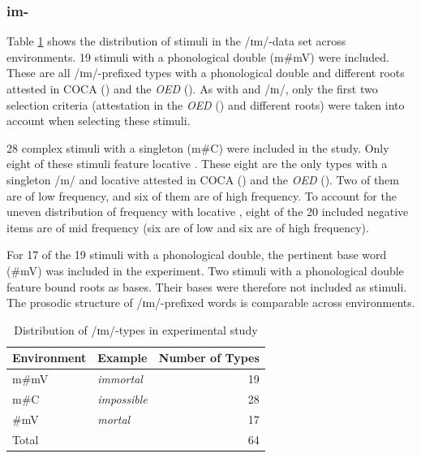 \subsubsection{im-}

Table \ref{tbl:distribution of im types in experiment} shows the distribution of  stimuli in the /ɪm/-data set across environments. 19 stimuli with a phonological double ({m\#mV}) were included. These are all /ɪm/-prefixed types with a phonological double and different roots attested in COCA (\citealt{Davies.20082014}) and the \textit{OED} (\citealt{OED.2013}). As with  and /ɪn/, only the first two selection criteria (attestation in the \textit{OED} (\citealt{OED.2013}) and different roots) were taken into account when selecting these stimuli.


28 complex stimuli with a singleton ({m\#C}) were included in the study. Only eight of these stimuli feature locative . These eight are the only types with a singleton /m/ and locative  attested in COCA (\citealt{Davies.20082014}) and the \textit{OED} (\citealt{OED.2013}). Two of them are of low frequency, and six of them are of high frequency.
 To account for the uneven distribution of frequency with locative , eight of the 20 included negative items are of mid frequency (six are of low and six are of high frequency).


For 17 of the 19 stimuli with a phonological double, the pertinent base word ({\#mV}) was included in the experiment. Two stimuli with a phonological double feature bound roots as bases. Their bases were therefore not included as stimuli. The prosodic structure of /ɪm/-prefixed words is comparable across environments.



\begin{table}[H]

	\caption{Distribution of /ɪm/-types in experimental study}
	\label{tbl:distribution of im types in experiment}

	\begin{center}
		\begin{tabular} {llr}


Environment &Example &Number of   Types\\

 \hline
 m\#mV&\color[HTML]{3166FF}\textit{immortal} & 19  \\
  m\#C&\color[HTML]{3166FF}\textit{impossible} & 28 \\
  \#mV&\color[HTML]{3166FF}\textit{mortal} & 17 \\
 \hline
 Total& & 64\\
 \hline

		\end{tabular}
	\end{center}
\end{table}



